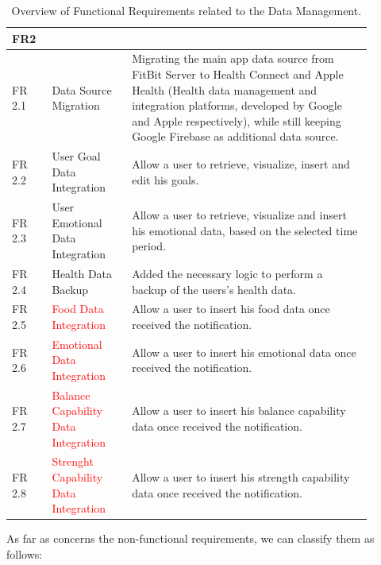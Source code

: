 \begin{table}[h!]
    \setstretch{\myspacing}
    \centering
    \begin{tabular}{|>{\raggedright\arraybackslash}p{0.1\linewidth}|>{\raggedright\arraybackslash}p{0.2\linewidth}|>{\raggedright\arraybackslash}p{0.6\linewidth}|}
        \hline
        \textbf{FR2} & \multicolumn{2}{>{\centering\arraybackslash}p{0.7\linewidth}|}{\textbf{Data Management}} \\
        \hline
        FR 2.1 & Data Source Migration & Migrating the main app data source from FitBit Server to Health Connect and Apple Health (Health data management and integration platforms, developed by Google and Apple respectively), while still keeping Google Firebase as additional data source. \\
        \hline
        FR 2.2 & User Goal Data Integration & Allow a user to retrieve, visualize, insert and edit his goals. \\
        \hline
        FR 2.3 & User Emotional Data Integration & Allow a user to retrieve, visualize and insert his emotional data, based on the selected time period. \\
        \hline
        FR 2.4 & Health Data Backup & Added the necessary logic to perform a backup of the users's health data. \\
        \hline
        FR 2.5 & \textcolor{red}{Food Data Integration} & Allow a user to insert his food data once received the notification. \\
        \hline
        FR 2.6 & \textcolor{red}{Emotional Data Integration} & Allow a user to insert his emotional data once received the notification. \\
        \hline
        FR 2.7 & \textcolor{red}{Balance Capability Data Integration} & Allow a user to insert his balance capability data once received the notification. \\
        \hline
        FR 2.8 & \textcolor{red}{Strenght Capability Data Integration} & Allow a user to insert his strength capability data once received the notification. \\
        \hline
    \end{tabular}
    \caption{Overview of Functional Requirements related to the Data Management.}
    \label{tab:fr2}
\end{table}

\clearpage

\noindent As far as concerns the non-functional requirements, we can classify them as follows:

